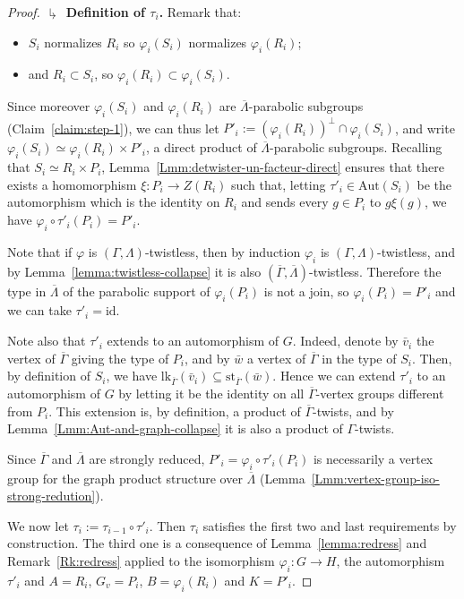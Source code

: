 \documentclass[a4paper,english,11pt]{article}
\theoremstyle{definition}
\theoremstyle{remark}
\newcommand{\st}{\mathrm{st}}
\newcommand{\lk}{\mathrm{lk}}
\newcommand{\Aut}{\mathrm{Aut}}
\newcommand{\twistor}{\xi}
\begin{document}
\begin{proof}
\textbf{$\drsh$ Definition of $\tau_i$.}
Remark that:
\begin{itemize}
    \item $S_i$ normalizes $R_i$ so $\varphi_i(S_i)$ normalizes $\varphi_i(R_i)$;
    \item and $R_i\subset S_i$, so $\varphi_i(R_i)\subset \varphi_i(S_i)$.
\end{itemize}
 Since moreover $\varphi_i(S_i)$ and $\varphi_i(R_i)$ are $\overline{\Lambda}$-parabolic subgroups (Claim~\ref{claim:step-1}), we can thus let $P'_i:=(\varphi_i(R_i))^\perp\cap\varphi_i(S_i)$, and write $\varphi_i(S_i)\simeq\varphi_i(R_i)\times P'_i$, a direct product of $\overline{\Lambda}$-parabolic subgroups. Recalling that $S_i\simeq R_i\times P_i$, Lemma~\ref{Lmm:detwister-un-facteur-direct} ensures that there exists a homomorphism $\twistor:P_i\to Z(R_i)$ such that, letting $\tau'_i\in\Aut(S_i)$ be the automorphism which is the identity on $R_i$ and sends every $g\in P_i$ to $g\twistor(g)$, we have $\varphi_i\circ\tau'_i(P_i)=P'_i$. 
 
 Note that if $\varphi$ is $(\Gamma,\Lambda)$-twistless, then by induction $\varphi_{i}$ is $(\Gamma,\Lambda)$-twistless, and by Lemma~\ref{lemma:twistless-collapse} it is also $(\overline{\Gamma},\overline{\Lambda})$-twistless. Therefore the type in $\overline{\Lambda}$ of the parabolic support of $\varphi_i(P_i)$ is not a join, so $\varphi_i(P_i)=P'_i$ and we can take $\tau'_i=\mathrm{id}$. 

Note also that $\tau'_i$ extends to an automorphism of $G$. Indeed, denote by $\bar v_i$ the vertex of $\overline{\Gamma}$ giving the type of $P_i$, and by $\bar w$ a vertex of $\overline{\Gamma}$ in the type of $S_i$. Then, by definition of $S_i$, we have $\lk_{\overline{\Gamma}}(\bar v_i) \subseteq \st_{\overline{\Gamma}}(\bar w)$. Hence we can extend $\tau'_i$ to an automorphism of $G$ by letting it be the identity on all $\overline{\Gamma}$-vertex groups different from $P_i$. This extension is, by definition, a product of $\overline{\Gamma}$-twists, and by Lemma~\ref{Lmm:Aut-and-graph-collapse} it is also a product of $\Gamma$-twists. 

Since $\overline{\Gamma}$ and $\overline{\Lambda}$ are strongly reduced, $P'_i=\varphi_i\circ\tau'_i(P_i)$ is necessarily a vertex group for the graph product structure over $\overline{\Lambda}$ (Lemma~\ref{Lmm:vertex-group-iso-strong-redution}).

We now let $\tau_i:=\tau_{i-1}\circ\tau'_i$. Then $\tau_i$ satisfies the first two and last requirements by construction. The third one is a consequence of Lemma~\ref{lemma:redress} and Remark~\ref{Rk:redress} applied to the isomorphism $\varphi_{i}:G\rightarrow H$, the automorphism $\tau'_i$ and $A=R_i$, $G_v=P_i$, $B=\varphi_{i}(R_i)$ and $K=P'_i$.


\end{proof}
\end{document}
